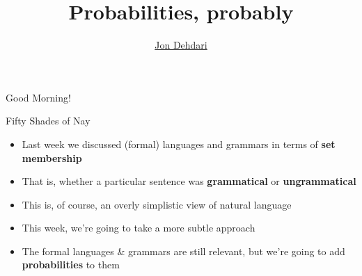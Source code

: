 \documentclass{beamer}
\begin{document}
\title{Probabilities, probably \\[1.5em]
 }
\author{\href{http://jon.dehdari.org}{Jon Dehdari}}
\frame{\titlepage}

\begin{frame}{Good Morning!}
	\begin{center}
	\end{center}
\end{frame}

\begin{frame}{Fifty Shades of Nay}
\begin{itemize}
	\item Last week we discussed (formal) languages and grammars in terms of \textbf{set membership}
	\pause
	\item That is, whether a particular sentence was \textbf{grammatical} or \textbf{ungrammatical}
	\pause
	\item This is, of course, an overly simplistic view of natural language
	\pause
	\item This week, we're going to take a more subtle approach
	\item The formal languages \& grammars are still relevant, but we're going to add \textbf{probabilities} to them
\end{itemize}
\end{frame}
\end{document}
